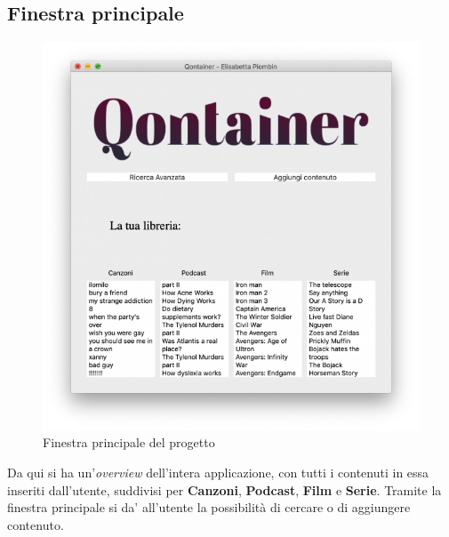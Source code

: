 \documentclass[a4paper,10pt]{article}
\begin{document}
\subsection{Finestra principale}

\begin{figure}[H]
	\begin{center}
		\includegraphics[width=\textwidth,keepaspectratio]{immagini/MainWindow.png}
	\end{center}
	\caption{\label{fig:my-label} Finestra principale del progetto}
\end{figure} 

Da qui si ha un'\textit{overview} dell'intera applicazione, con tutti i contenuti in essa inseriti dall'utente, suddivisi per \textbf{Canzoni}, \textbf{Podcast}, \textbf{Film} e \textbf{Serie}. Tramite la finestra principale si da' all'utente la possibilit\`a di cercare o di aggiungere contenuto.\\
\end{document}
